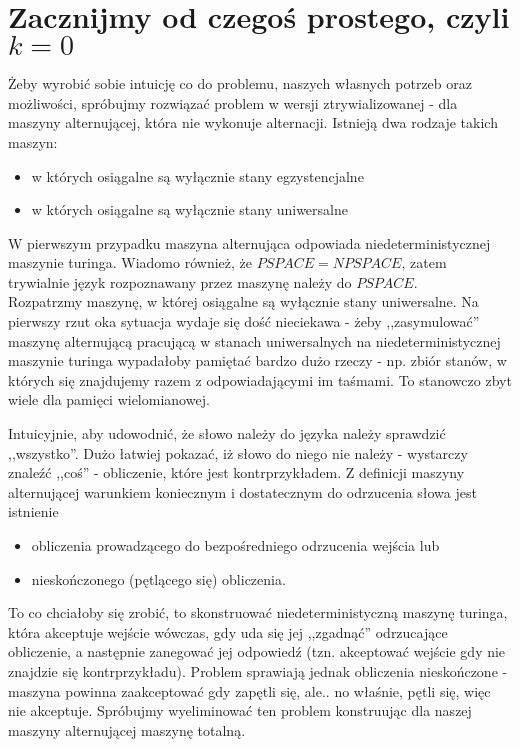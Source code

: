 \documentclass[a4paper,11pt]{article}
\begin{document}
\section*{Zacznijmy od czegoś prostego, czyli $k=0$}

Żeby wyrobić sobie intuicję co do problemu, naszych własnych potrzeb oraz
możliwości, spróbujmy rozwiązać problem w wersji ztrywializowanej - dla maszyny
alternującej, która nie wykonuje alternacji. Istnieją dwa rodzaje takich maszyn:
\begin{itemize}
  \item{w których osiągalne są wyłącznie stany egzystencjalne}
  \item{w których osiągalne są wyłącznie stany uniwersalne}
\end{itemize}

W pierwszym przypadku maszyna alternująca odpowiada niedeterministycznej
maszynie turinga. Wiadomo również, że $PSPACE = NPSPACE$, zatem trywialnie język
rozpoznawany przez maszynę należy do $PSPACE$. \\


Rozpatrzmy maszynę, w której osiągalne są wyłącznie stany uniwersalne. Na
pierwszy rzut oka sytuacja wydaje się dość nieciekawa - żeby ,,zasymulować''
maszynę alternującą pracującą w stanach uniwersalnych na niedeterministycznej
maszynie turinga wypadałoby pamiętać bardzo dużo rzeczy - np. zbiór stanów, w
których się znajdujemy razem z odpowiadającymi im taśmami. To stanowczo
zbyt wiele dla pamięci wielomianowej.

Intuicyjnie, aby udowodnić, że słowo należy do języka należy sprawdzić
,,wszystko''. Dużo łatwiej pokazać, iż słowo do niego nie należy - wystarczy
znaleźć ,,coś'' - obliczenie, które jest kontrprzykładem. Z definicji maszyny
alternującej  warunkiem koniecznym i dostatecznym do odrzucenia słowa jest
istnienie
\begin{itemize}
  \item{obliczenia prowadzącego do bezpośredniego odrzucenia wejścia lub}
  \item{nieskończonego (pętlącego się) obliczenia.}
\end{itemize}

To co chciałoby się zrobić, to skonstruować niedeterministyczną maszynę turinga,
która akceptuje wejście wówczas, gdy uda się jej ,,zgadnąć'' odrzucające
obliczenie, a następnie zanegować jej odpowiedź (tzn. akceptować wejście gdy nie
znajdzie się kontrprzykładu). Problem sprawiają jednak obliczenia nieskończone -
maszyna powinna zaakceptować gdy zapętli się, ale.. no właśnie, pętli się, więc
nie akceptuje. Spróbujmy wyeliminować ten problem konstruując dla naszej maszyny
alternującej maszynę totalną.
\end{document}
